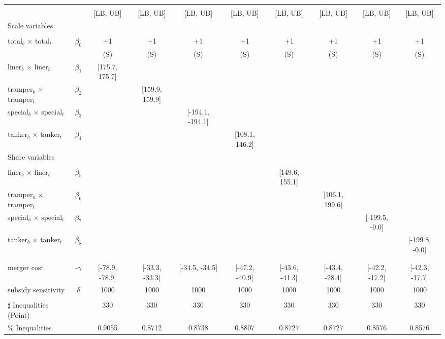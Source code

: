 \begin{tabular}{@{\extracolsep{5pt}}lccccccccc}
\toprule 
 &  &  &  &  &  &  &  &  &  \\
 &  & [LB, UB] & [LB, UB] & [LB, UB] & [LB, UB] & [LB, UB] & [LB, UB] & [LB, UB] & [LB, UB] \\
\midrule 
Scale variables &  &  &  &  &  &  &  \\
 &  &  &  &  &  &  &  &  \\
total$_{b}$ $\times$ total$_{t}$ & $\beta_0$ & +1 & +1 & +1 & +1 & +1 & +1 & +1 & +1 \\
 &  & (S) & (S) & (S) & (S) & (S) & (S) & (S) & (S) \\
liner$_{b}$ $\times$ liner$_{t}$ & $\beta_1$ & [175.7, 175.7] &  &  &  &  &  &  &  \\
tramper$_{b}$ $\times$ tramper$_{t}$ & $\beta_2$ &  & [159.9, 159.9] &  &  &  &  &  &  \\
special$_{b}$ $\times$ special$_{t}$ & $\beta_3$ &  &  & [-194.1, -194.1] &  &  &  &  &  \\
tanker$_{b}$ $\times$ tanker$_{t}$ & $\beta_4$ &  &  &  & [108.1, 146.2] &  &  &  &  \\
Share variables &  &  &  &  &  &  &  &  &  \\
 &  &  &  &  &  &  &  &  &  \\
liner$_{b}$ $\times$ liner$_{t}$ & $\beta_5$ &  &  &  &  & [149.6, 155.1] &  &  &  \\
tramper$_{b}$ $\times$ tramper$_{t}$ & $\beta_6$ &  &  &  &  &  & [106.1, 199.6] &  &  \\
special$_{b}$ $\times$ special$_{t}$ & $\beta_7$ &  &  &  &  &  &  & [-199.5, -0.0] &  \\
tanker$_{b}$ $\times$ tanker$_{t}$ & $\beta_8$ &  &  &  &  &  &  &  & [-199.8, -0.0] \\
 &  &  &  &  &  &  &  &  &  \\
 &  &  &  &  &  &  &  &  &  \\
merger cost & -$\gamma$ & [-78.9, -78.9] & [-33.3, -33.3] & [-34.5, -34.5] & [-47.2, -40.9] & [-43.6, -41.3] & [-43.4, -28.4] & [-42.2, -17.2] & [-42.3, -17.7] \\
subsidy sensitivity & $\delta$ & 1000 & 1000 & 1000 & 1000 & 1000 & 1000 & 1000 & 1000 \\
 &  &  &  &  &  &  &  &  &  \\
\hline 
$\sharp$ Inequalities (Point) &  & 330 & 330 & 330 & 330 & 330 & 330 & 330 & 330 \\
\% Inequalities &  & 0.9055 & 0.8712 & 0.8738 & 0.8807 & 0.8727 & 0.8727 & 0.8576 & 0.8576 \\
\bottomrule 
\end{tabular}
